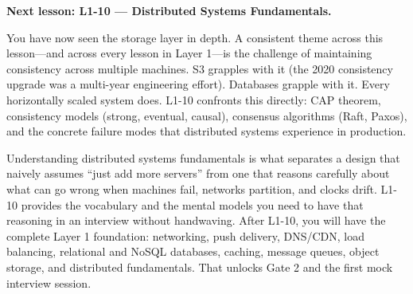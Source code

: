 \documentclass[11pt,a4paper]{article}
\begin{document}
\begin{insightbox}
\textbf{Next lesson: L1-10 --- Distributed Systems Fundamentals.}

You have now seen the storage layer in depth. A consistent theme across this lesson---and across every lesson in Layer 1---is the challenge of maintaining consistency across multiple machines. S3 grapples with it (the 2020 consistency upgrade was a multi-year engineering effort). Databases grapple with it. Every horizontally scaled system does. L1-10 confronts this directly: CAP theorem, consistency models (strong, eventual, causal), consensus algorithms (Raft, Paxos), and the concrete failure modes that distributed systems experience in production.

Understanding distributed systems fundamentals is what separates a design that naively assumes ``just add more servers'' from one that reasons carefully about what can go wrong when machines fail, networks partition, and clocks drift. L1-10 provides the vocabulary and the mental models you need to have that reasoning in an interview without handwaving. After L1-10, you will have the complete Layer 1 foundation: networking, push delivery, DNS/CDN, load balancing, relational and NoSQL databases, caching, message queues, object storage, and distributed fundamentals. That unlocks Gate 2 and the first mock interview session.
\end{insightbox}
\end{document}
